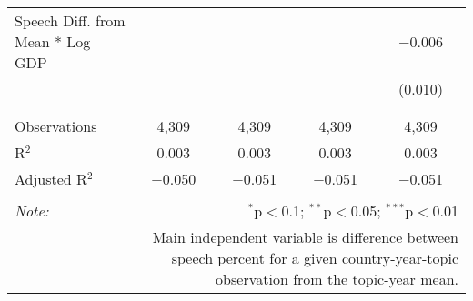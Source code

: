 \begin{table}[!htbp]
\begin{tabular}{@{\extracolsep{5pt}}lcccc}
 Speech Diff. from Mean * Log GDP &  &  &  & $-$0.006 \\ 
  &  &  &  & (0.010) \\ 
  & & & & \\ 
\hline \\[-1.8ex] 
Observations & 4,309 & 4,309 & 4,309 & 4,309 \\ 
R$^{2}$ & 0.003 & 0.003 & 0.003 & 0.003 \\ 
Adjusted R$^{2}$ & $-$0.050 & $-$0.051 & $-$0.051 & $-$0.051 \\ 
\hline 
\hline \\[-1.8ex] 
\textit{Note:}  & \multicolumn{4}{r}{$^{*}$p$<$0.1; $^{**}$p$<$0.05; $^{***}$p$<$0.01} \\ 
 & \multicolumn{4}{r}{Main independent variable is difference between speech percent for a given country-year-topic observation from the topic-year mean.} \\ 
\end{tabular} 
\end{table} 
